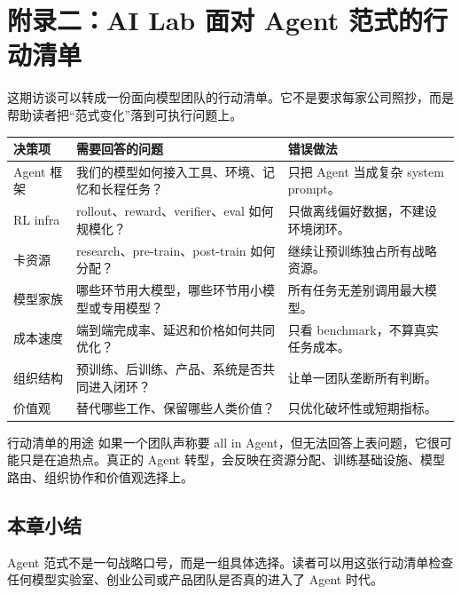 \section{附录二：AI Lab 面对 Agent 范式的行动清单}

这期访谈可以转成一份面向模型团队的行动清单。它不是要求每家公司照抄，而是帮助读者把“范式变化”落到可执行问题上。

\noindent\begin{longtable}{p{}p{}p{}}
\toprule
决策项 & 需要回答的问题 & 错误做法 \\
\midrule
Agent 框架 & 我们的模型如何接入工具、环境、记忆和长程任务？ & 只把 Agent 当成复杂 system prompt。 \\
RL infra & rollout、reward、verifier、eval 如何规模化？ & 只做离线偏好数据，不建设环境闭环。 \\
卡资源 & research、pre-train、post-train 如何分配？ & 继续让预训练独占所有战略资源。 \\
模型家族 & 哪些环节用大模型，哪些环节用小模型或专用模型？ & 所有任务无差别调用最大模型。 \\
成本速度 & 端到端完成率、延迟和价格如何共同优化？ & 只看 benchmark，不算真实任务成本。 \\
组织结构 & 预训练、后训练、产品、系统是否共同进入闭环？ & 让单一团队垄断所有判断。 \\
价值观 & 替代哪些工作、保留哪些人类价值？ & 只优化破坏性或短期指标。 \\
\bottomrule
\end{longtable}

\begin{importantbox}{行动清单的用途}
如果一个团队声称要 all in Agent，但无法回答上表问题，它很可能只是在追热点。真正的 Agent 转型，会反映在资源分配、训练基础设施、模型路由、组织协作和价值观选择上。
\end{importantbox}

\subsection{本章小结}

Agent 范式不是一句战略口号，而是一组具体选择。读者可以用这张行动清单检查任何模型实验室、创业公司或产品团队是否真的进入了 Agent 时代。


